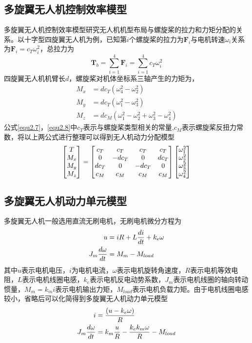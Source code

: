\subsection{多旋翼无人机控制效率模型}
多旋翼无人机控制效率模型研究无人机机型布局与螺旋桨的拉力和力矩分配的关系\upcite{[2.4]}。以十字型四旋翼无人机为例，已知第$i$个螺旋桨的拉力为$\boldsymbol{F}_i$与电机转速$\omega_i$关系为$\boldsymbol{F}_i = c_T \omega_i^2$，总拉力为
\begin{equation}
\label{equ2.7}
\boldsymbol{T}_b = \sum\limits_{i=1}^4 \boldsymbol{F}_i =  \sum\limits_{i=1}^4 c_T \omega_i^2
\end{equation}
四旋翼无人机机臂长$d$，螺旋桨对机体坐标系三轴产生的力矩为，
\begin{equation}
\label{equ2.8}
\begin{aligned}
M_x &= d c_T \left( \omega_4^2 - \omega_2^2\right)
\\
M_y &= d c_T \left( \omega_1^2 - \omega_3^2\right)
\\
M_z &= d c_M \left( \omega_1^2 - \omega_2^2 + \omega_3^2 - \omega_4^2\right)
\end{aligned}
\end{equation}
公式\eqref{equ2.7}，\eqref{equ2.8}中$c_T $表示与螺旋桨类型相关的常量,$c_M$表示螺旋桨反扭力常数，将以上两公式进行整理可以得到无人机动力分配模型
\begin{equation}
\label{equ2.9}
\begin{bmatrix}
T \cr M_x \cr M_y \cr M_z \cr 
\end{bmatrix}
=
\begin{bmatrix}
c_T & c_T & c_T & c_T  \cr
0 & -d c_T & 0 & d c_T \cr
d c_T & 0 & -d c_T & 0 \cr
c_M & c_M & c_M & c_M  \cr
\end{bmatrix}
\begin{bmatrix}
\omega_1^2 \cr \omega_2^2 \cr \omega_3^2 \cr \omega_4^2 \cr
\end{bmatrix}
\end{equation}


\subsection{多旋翼无人机动力单元模型}
多旋翼无人机一般选用直流无刷电机，无刷电机微分方程为
\begin{equation}
\label{equ2.10}
\begin{aligned}
u &= iR + L {di \over dt} + k_e \omega
\\
J_m {d\omega \over dt} &= M_m - M_{load}
\end{aligned}
\end{equation}
其中$u$表示电机电压，$i$为电机电流，$\omega$表示电机旋转角速度，$R$表示电机等效电阻，$L$表示电机线圈电感，$k_e$表示电机反电动势系数，$J_m$表示电机线圈的轴向转动惯量，$M_m=k_m i$表示电机输出力矩，$M_{load}$表示电机负载力矩。由于电机线圈电感较小，省略后可以化简得到多旋翼无人机动力单元模型
\begin{equation}
\label{equ2.11}
\begin{aligned}
i &= {(u-k_e \omega) \over R }
\\
J_m {d \omega \over dt} &= k_m{u \over R } - {k_e k_m \omega \over R} - M_{load}
\end{aligned}
\end{equation}

